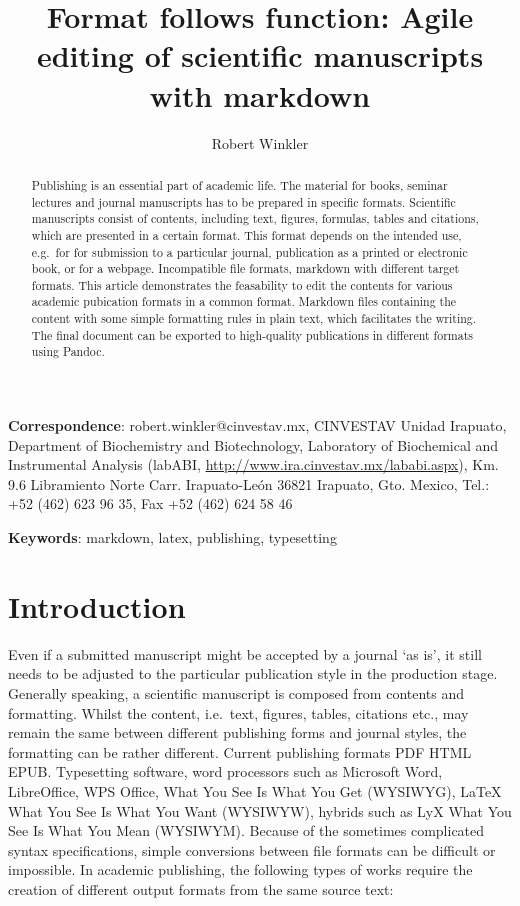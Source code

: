 \documentclass[10pt,fleq]{wlpeerj}
\title{Format
follows
function:
Agile
editing of
scientific
manuscripts
with
markdown}
\author{Robert
Winkler}
\date{}
\begin{document}
\maketitle
\begin{abstract}
Publishing
is an
essential
part of
academic
life. The
material
for books,
seminar
lectures
and
journal
manuscripts
has to be
prepared
in
specific
formats.
Scientific
manuscripts
consist of
contents,
including
text,
figures,
formulas,
tables and
citations,
which are
presented
in a
certain
format.
This
format
depends on
the
intended
use,
e.g.~for
for
submission
to a
particular
journal,
publication
as a
printed or
electronic
book, or
for a
webpage.
Incompatible
file
formats,
markdown
with
different
target
formats.
This
article
demonstrates
the
feasability
to edit
the
contents
for
various
academic
pubication
formats in
a common
format.
Markdown
files
containing
the
content
with some
simple
formatting
rules in
plain
text,
which
facilitates
the
writing.
The final
document
can be
exported
to
high-quality
publications
in
different
formats
using
Pandoc.
\end{abstract}

\textbf{Correspondence}:
robert.winkler@cinvestav.mx,
CINVESTAV
Unidad
Irapuato,
Department
of
Biochemistry
and
Biotechnology,
Laboratory
of
Biochemical
and
Instrumental
Analysis
(labABI,
\url{http://www.ira.cinvestav.mx/lababi.aspx}),
Km. 9.6
Libramiento
Norte
Carr.
Irapuato-León
36821
Irapuato,
Gto.
Mexico,
Tel.: +52
(462) 623
96 35, Fax
+52 (462)
624 58 46

\textbf{Keywords}:
markdown,
latex,
publishing,
typesetting

\section{Introduction}\label{introduction}

Even if a
submitted
manuscript
might be
accepted
by a
journal
`as is',
it still
needs to
be
adjusted
to the
particular
publication
style in
the
production
stage.
Generally
speaking,
a
scientific
manuscript
is
composed
from
contents
and
formatting.
Whilst the
content,
i.e.~text,
figures,
tables,
citations
etc., may
remain the
same
between
different
publishing
forms and
journal
styles,
the
formatting
can be
rather
different.
Current
publishing
formats
PDF HTML
EPUB.
Typesetting
software,
word
processors
such as
Microsoft
Word,
LibreOffice,
WPS
Office,
What You
See Is
What You
Get
(WYSIWYG),
LaTeX What
You See Is
What You
Want
(WYSIWYW),
hybrids
such as
LyX What
You See Is
What You
Mean
(WYSIWYM).
Because of
the
sometimes
complicated
syntax
specifications,
simple
conversions
between
file
formats
can be
difficult
or
impossible.
In
academic
publishing,
the
following
types of
works
require
the
creation
of
different
output
formats
from the
same
source
text:
\end{document}
